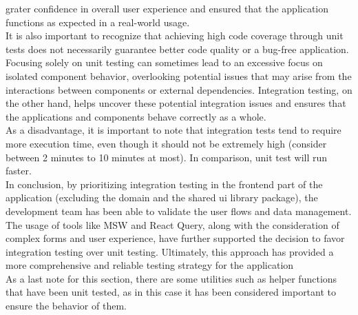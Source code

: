 \documentclass[./memory.tex]{subfiles}
\begin{document}
grater confidence in overall user experience and ensured that the application
functions as expected in a real-world usage.
\\[8pt]
It is also important to recognize that achieving high code coverage through unit
tests does not necessarily guarantee better code quality or a bug-free
application. Focusing solely on unit testing can sometimes lead to an excessive
focus on isolated component behavior, overlooking potential issues that may
arise from the interactions between components or external dependencies.
Integration testing, on the other hand, helps uncover these potential
integration issues and ensures that the applications and components behave
correctly as a whole.
\\[8pt]
As a disadvantage, it is important to note that integration tests tend to
require more execution time, even though it should not be extremely high
(consider between 2 minutes to 10 minutes at most). In comparison, unit test
will run faster.
\\[8pt]
In conclusion, by prioritizing integration testing in the frontend part of the
application (excluding the domain and the shared ui library package), the
development team has been able to validate the user flows and data management.
The usage of tools like MSW and React Query, along with the consideration of
complex forms and user experience, have further supported the decision to favor
integration testing over unit testing. Ultimately, this approach has provided a
more comprehensive and reliable testing strategy for the application
\\[8pt]
As a last note for this section, there are some utilities such as helper
functions that have been unit tested, as in this case it has been considered
important to ensure the behavior of them.
\end{document}
